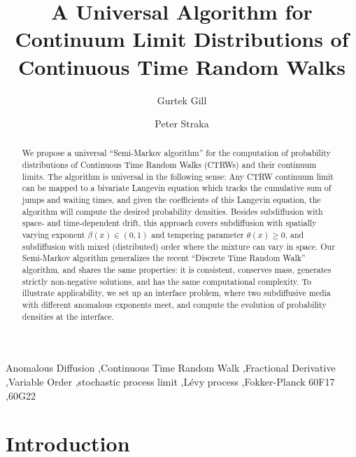 \documentclass[a4paper,12pt]{elsarticle}
\numberwithin{equation}{section}
\theoremstyle{plain}
\theoremstyle{definition}
\theoremstyle{remark}
\numberwithin{equation}{section}
\newcommand{\1}{\mathbf 1}
\begin{document}
\begin{frontmatter}

\title{A Universal Algorithm for Continuum Limit Distributions of
Continuous Time Random Walks}
\author[UNSW]{Gurtek Gill}
\author[UNSW]{Peter Straka}
\address[UNSW]{School of Mathematics \& Statistics, UNSW Sydney}

\begin{abstract}
We propose a universal ``Semi-Markov algorithm'' for the computation of
probability distributions of Continuous Time Random Walks (CTRWs) and their
continuum limits.
The algorithm is universal in the following sense: Any CTRW continuum limit
can be mapped to a bivariate Langevin equation which tracks the cumulative sum
of jumps and waiting times, and given the coefficients of this Langevin
equation, the algorithm will compute the desired probability densities.
Besides subdiffusion with space- and time-dependent drift, this approach
covers subdiffusion with spatially varying exponent $\beta(x) \in (0,1)$ and
tempering parameter $\theta(x) \ge 0$, and subdiffusion with mixed (distributed)
order where the mixture can vary in space.
Our Semi-Markov algorithm generalizes the recent
``Discrete Time Random Walk'' algorithm, and shares the same properties:
it is consistent, conserves mass, generates strictly non-negative solutions,
and has the same computational complexity.
To illustrate applicability, we set up an interface problem, where two
subdiffusive media with different anomalous exponents meet, and compute the
evolution of probability densities at the interface.
\end{abstract}

\begin{keyword}
Anomalous Diffusion \sep Continuous Time Random Walk \sep Fractional Derivative \sep Variable Order \sep stochastic process limit \sep L\'evy process \sep Fokker-Planck
\MSC[2010] 60F17 \sep  60G22
\end{keyword}

\end{frontmatter}

\section{Introduction}
\end{document}
